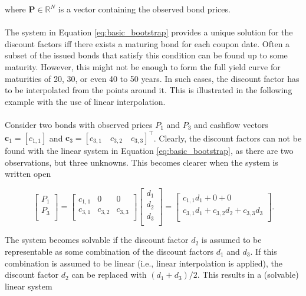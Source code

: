 \documentclass[a4paper]{artikel3}
\newcommand{\R}{\mathbb{R}}    %
\numberwithin{equation}{section}
\numberwithin{theorem}{section}
\numberwithin{proposition}{section}
\numberwithin{lemma}{section}
\begin{document}
where $\mathbf{P} \in \R^N$ is a vector containing the observed bond prices. \\
\\
The system in Equation \eqref{eq:basic_bootstrap} provides a unique solution for the discount factors iff there exists a maturing bond for each coupon date. Often a subset of the issued bonds that satisfy this condition can be found up to some maturity. However, this might not be enough to form the full yield curve for maturities of 20, 30, or even 40 to 50 years. In such cases, the discount factor has to be interpolated from the points around it. This is illustrated in the following example with the use of linear interpolation. \\
\\
Consider two bonds with observed prices $P_1$ and $P_3$ and cashflow vectors $\mathbf{c}_1 = [c_{1, 1}]$ and $\mathbf{c}_3 = [c_{3, 1} \quad c_{3, 2} \quad c_{3, 3}]^\top$. Clearly, the discount factors can not be found with the linear system in Equation \eqref{eq:basic_bootstrap}, as there are two observations, but three unknowns. This becomes clearer when the system is written open

\begin{equation*}
    \begin{bmatrix}
        P_1 \\
        P_3 \\
    \end{bmatrix} = 
    \begin{bmatrix}
        c_{1, 1} & 0        & 0        \\
        c_{3, 1} & c_{3, 2} & c_{3, 3} \\
    \end{bmatrix} 
    \begin{bmatrix}
        d_1 \\
        d_2 \\
        d_3 \\
    \end{bmatrix} = 
    \begin{bmatrix}
        c_{1, 1}d_1 + 0 + 0 \\
        c_{3, 1}d_1 + c_{3, 2}d_2 + c_{3, 3}d_3 \\
    \end{bmatrix} .
\end{equation*}

The system becomes solvable if the discount factor $d_2$ is assumed to be representable as some combination of the discount factors $d_1$ and $d_3$. If this combination is assumed to be linear (i.e., linear interpolation is applied), the discount factor $d_2$ can be replaced with $(d_1 + d_3)/2$. This results in a (solvable) linear system
\end{document}
